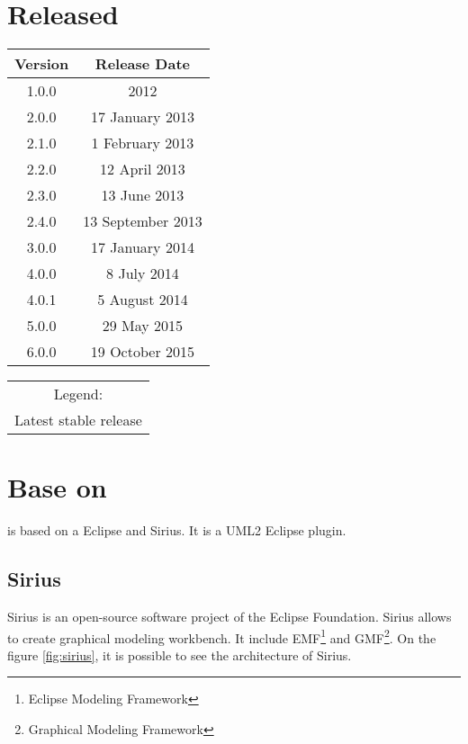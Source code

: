 \section{Released}
\begin{center}

  \begin{tabular}{|c|c|}
    \hline
    \textbf{Version} & \textbf{Release Date} \\
    \hline
    1.0.0 &2012\\
    \hline
    2.0.0 &17 January 2013\\
    \hline
    2.1.0 &1 February 2013\\
    \hline
    2.2.0 &12 April 2013\\
    \hline
    2.3.0 &13 June 2013\\
    \hline
    2.4.0 &13 September 2013\\
    \hline
    3.0.0 &17 January 2014\\
    \hline
    4.0.0 &8 July 2014\\
    \hline
    4.0.1 &5 August 2014\\
    \hline
    5.0.0 &29 May 2015\\
    \hline
    \cellcolor{green}6.0.0 &19 October 2015\\
    \hline
  \end{tabular}

  \begin{tabular}{c}
    Legend:\\
    \cellcolor{green}Latest stable release\\
  \end{tabular}

\end{center}

\section{Base on}

\umld is based on a Eclipse and Sirius. It is a UML2 Eclipse plugin.

\subsection{Sirius}
Sirius is an open-source software project of the Eclipse Foundation. Sirius allows to create graphical modeling workbench. It include EMF\footnote{Eclipse Modeling Framework} and GMF\footnote{Graphical Modeling Framework}. On the figure \ref{fig:sirius}, it is possible to see the architecture of Sirius.


